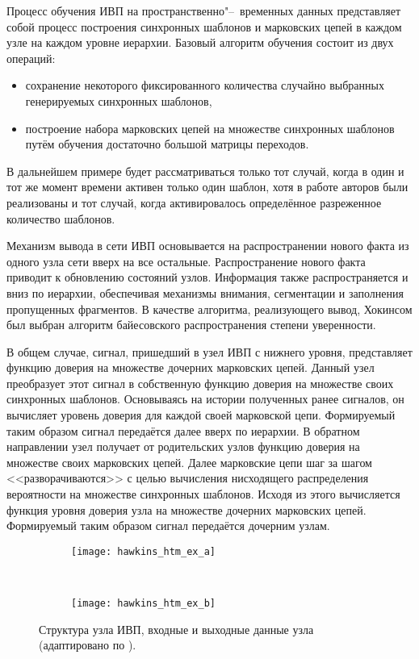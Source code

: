 Процесс обучения ИВП на пространственно"--~временных данных представляет собой процесс построения синхронных шаблонов и марковских цепей в каждом узле на каждом уровне иерархии. Базовый алгоритм обучения состоит из двух операций:
\begin{itemize}
	\item сохранение некоторого фиксированного количества случайно выбранных генерируемых синхронных шаблонов,
	\item построение набора марковских цепей на множестве синхронных шаблонов путём обучения достаточно большой матрицы переходов.
\end{itemize}
В дальнейшем примере будет рассматриваться только тот случай, когда в один и тот же момент времени активен только один шаблон, хотя в работе авторов были реализованы и тот случай, когда активировалось определённое разреженное количество шаблонов.

Механизм вывода в сети ИВП основывается на распространении нового факта из одного узла сети вверх на все остальные. Распространение нового факта приводит к обновлению состояний узлов. Информация также распространяется и вниз по иерархии, обеспечивая механизмы внимания, сегментации и заполнения пропущенных фрагментов. В качестве алгоритма, реализующего вывод, Хокинсом был выбран алгоритм байесовского распространения степени уверенности.

В общем случае, сигнал, пришедший в узел ИВП с нижнего уровня, представляет функцию доверия на множестве дочерних марковских цепей. Данный узел преобразует этот сигнал в собственную функцию доверия на множестве своих синхронных шаблонов. Основываясь на истории полученных ранее сигналов, он вычисляет уровень доверия для каждой своей марковской цепи. Формируемый таким образом сигнал передаётся далее вверх по иерархии. В обратном направлении узел получает от родительских узлов функцию доверия на множестве своих марковских цепей. Далее марковские цепи шаг за шагом <<разворачиваются>> с целью вычисления нисходящего распределения вероятности на множестве синхронных шаблонов. Исходя из этого вычисляется функция уровня доверия узла на множестве дочерних марковских цепей. Формируемый таким образом сигнал передаётся дочерним узлам.

\begin{figure}[h]
	\centering
	\begin{subfigure}[b]{0.45\textwidth}
		\texttt{[image: hawkins\_htm\_ex\_a]}
		\caption{}
		\label{fg:hawkins_htm_ex_a}
	\end{subfigure}
	~
	\begin{subfigure}[b]{0.45\textwidth}
		\texttt{[image: hawkins\_htm\_ex\_b]}
		\caption{}
		\label{fg:hawkins_htm_ex_b}
	\end{subfigure}
	\caption{Структура узла ИВП, входные и выходные данные узла (адаптировано по \cite{Hawkins2009}).}
	\label{fg:hawkins_htm_ex}
\end{figure}

